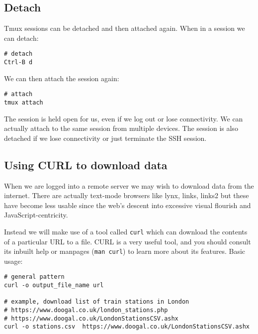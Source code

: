 \subsection{Detach}

Tmux sessions can be detached and then attached again.
When in a session we can detach:
\begin{verbatim}
# detach 
Ctrl-B d 
\end{verbatim}

We can then attach the session again:
\begin{verbatim}
# attach
tmux attach
\end{verbatim}

The session is held open for us, even if we log out or lose connectivity.
We can actually attach to the same session from multiple devices.
The session is also detached if we lose connectivity or just terminate the SSH session.

\subsection{Using CURL to download data}
\label{using-curl-to-download-data}

When we are logged into a remote server we may wish to download data
from the internet. There are actually text-mode browsers like lynx,
links, links2 but these have become less usable since the web's descent
into excessive visual flourish and JavaScript-centricity.

Instead we will make use of a tool called \texttt{curl} which can
download the contents of a particular URL to a file. CURL is a very
useful tool, and you should consult its inbuilt help or manpages
(\texttt{man\ curl}) to learn more about its features. Basic usage:

\begin{verbatim}
# general pattern
curl -o output_file_name url

# example, download list of train stations in London
# https://www.doogal.co.uk/london_stations.php
# https://www.doogal.co.uk/LondonStationsCSV.ashx
curl -o stations.csv  https://www.doogal.co.uk/LondonStationsCSV.ashx
\end{verbatim}


